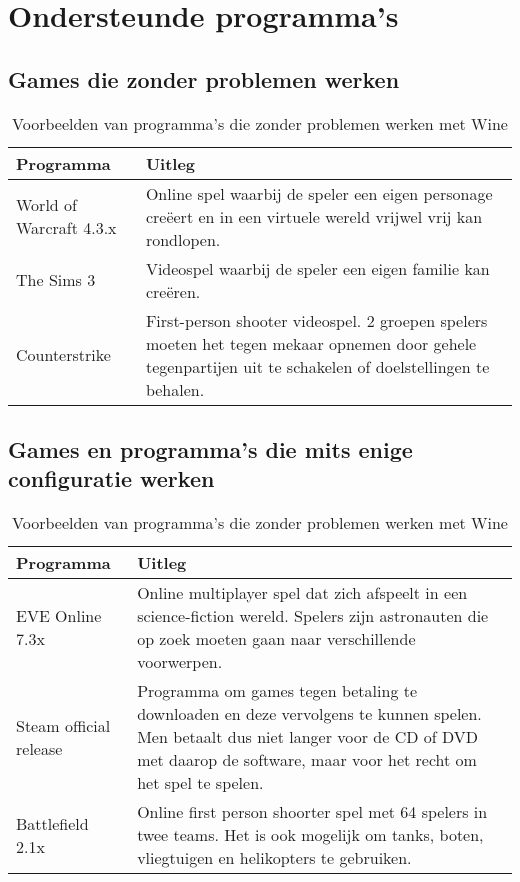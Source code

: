 \documentclass[12pt]{article}
\begin{document}
\section{Ondersteunde programma's}
\subsection{Games die zonder problemen werken}

\begin{center}
\begin{table} [h]
\begin{tabular}{ | l | p{10cm} |}
	\hline
    Programma & Uitleg \\ \hline
   	 World of Warcraft 4.3.x & Online spel waarbij de speler een eigen 	personage cre\"{e}ert en in een virtuele wereld vrijwel vrij kan rondlopen. \\ 			\hline
    The Sims 3 & Videospel waarbij de speler een eigen familie kan cre\"{e}ren. \\ \hline
    Counterstrike & First-person shooter videospel. 2 groepen spelers moeten het tegen mekaar opnemen door gehele tegenpartijen uit te schakelen of 			doelstellingen te behalen. \\
    \hline
\end{tabular}
\caption{Voorbeelden van programma's die zonder problemen werken met Wine}
\end{table}
\end{center}

\subsection{Games en programma's die mits enige configuratie werken}

\begin{center}
\begin{table} [h]
\begin{tabular}{ | l | p{10cm} |}
	\hline
    Programma & Uitleg \\ \hline
   	 EVE Online 7.3x & Online multiplayer spel dat zich afspeelt in een science-fiction wereld. Spelers zijn astronauten die op zoek moeten gaan naar verschillende voorwerpen. \\ 			\hline
    Steam official release &  Programma om games tegen betaling te downloaden en deze vervolgens te kunnen spelen. Men betaalt dus niet langer voor de CD of DVD met daarop de software, maar voor het recht om het spel te spelen.\\ \hline
    Battlefield 2.1x &  Online first person shoorter spel met 64 spelers in twee teams. Het is ook mogelijk om tanks, boten, vliegtuigen en helikopters te gebruiken.\\
    \hline
\end{tabular}
\caption{Voorbeelden van programma's die zonder problemen werken met Wine}
\end{table}
\end{center}
\end{document}
